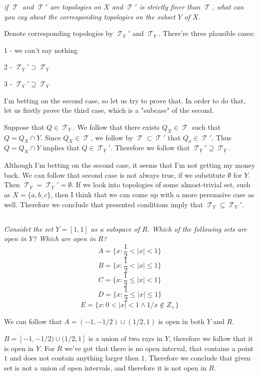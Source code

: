 \documentclass[11pt,oneside,titlepage]{book}
\DeclareMathOperator \topol {\mathcal {T}}
\newcommand{\set}[1]{\{ #1 \}}
\begin{document}
\textit{if $\topol$ and $\topol'$ are topologies on $X$ and $\topol'$ is strictly finer
  than $\topol$, what can you cay about the corresponding topologies on the subset $Y$ of $X$.}

Denote corresponding topologies by $\topol_Y'$ and $\topol_Y$.
There're three plausible cases:

1 - we can't say nothing

2 - $\topol_Y' \supset \topol_Y$

3 - $\topol_Y' \supseteq \topol_Y$

I'm betting on the second case, so let us try to prove that. In order to do that, let us firstly
prove the third case, which is a "subcase" of the second.

Suppose that $Q \in \topol_Y$. We follow that there exists $Q_X \in \topol$ such that
$Q = Q_X \cap Y$. Since $Q_X \in \topol$, we follow by $\topol \subset \topol'$ that
$Q_x \in \topol'$. Thus $Q = Q_X \cap Y$ implies that $Q \in \topol_Y'$. Therefore we follow that
$\topol_Y' \supseteq \topol_Y$.

Although I'm betting on the second case, it seems that I'm not getting my money back.
We can follow that second case is not always true, if we substitute $\emptyset$ for $Y$.
Then $\topol_Y = \topol_Y' = \emptyset$. If we look into topologies of some
almost-trivial set, such as $X = \set{a, b, c}$, then I think that we can come up with a more
persuasive case as well. Therefore we conclude that
presented conditions imply that $\topol_Y \subseteq \topol_Y'$.

\subsection{}

\textit{Considet the set $Y = [1, 1]$ as a subspace of $R$. Which of the following sets are
  open in $Y$? Which are open in $R$?
  $$A = \set{x : \frac{1}{2} < |x| < 1 }$$
  $$B = \set{x : \frac{1}{2} < |x| \leq 1 }$$
  $$C = \set{x : \frac{1}{2} \leq |x| < 1 }$$
  $$D = \set{x : \frac{1}{2} \leq |x| \leq 1 }$$
  $$E = \set{x : 0 < |x| < 1 \land 1/x \notin Z_+ }$$
}

We can follow that
$A = (-1, -1/2) \cup (1/2, 1)$
is open in both $Y$ and $R$.

$B = [-1, -1/2) \cup (1/2, 1]$
is a union of two rays in $Y$, therefore we follow that it is open in $Y$. For $R$ we've got that
there is no open interval, that contains a point $1$ and does not contain anything larger
then $1$. Therefore we conclude that given set is not a union of open intervals, and therefore
it is not open in $R$.
\end{document}
